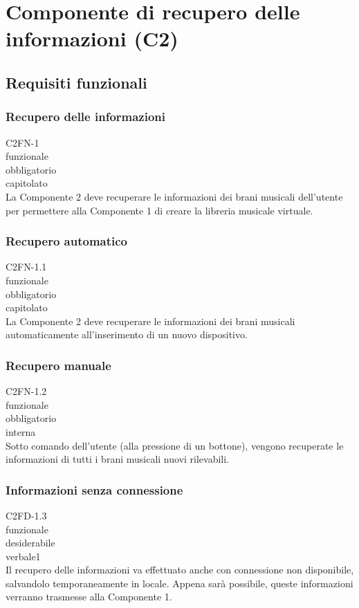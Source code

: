 
\section{Componente di recupero delle informazioni (C2)}

\subsection{Requisiti funzionali}
\subsubsection*{Recupero delle informazioni}
 C2FN-1 \\
 funzionale \\
 obbligatorio \\
 capitolato \\
La Componente 2 deve recuperare le informazioni dei brani musicali dell'utente
per permettere alla Componente 1 di creare la libreria musicale virtuale.

\subsubsection*{Recupero automatico}
 C2FN-1.1 \\
 funzionale \\
 obbligatorio \\
 capitolato \\
La Componente 2 deve recuperare le informazioni dei brani musicali
automaticamente all'inserimento di un nuovo dispositivo.

\subsubsection*{Recupero manuale}
 C2FN-1.2 \\
 funzionale \\
 obbligatorio \\
 interna \\
Sotto comando dell'utente (alla pressione di un bottone), vengono recuperate le
informazioni di tutti i brani musicali nuovi rilevabili.

\subsubsection*{Informazioni senza connessione}
 C2FD-1.3 \\
 funzionale \\
 desiderabile \\
 verbale1 \\
Il recupero delle informazioni va effettuato anche con connessione non
disponibile, salvandolo temporaneamente in locale. Appena sar\`a possibile, queste
informazioni verranno trasmesse alla Componente 1.

